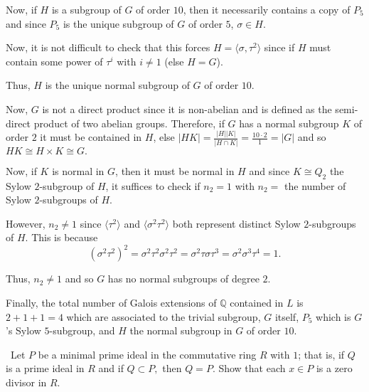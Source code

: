 \documentclass[12pt]{AlgebraQual}
\begin{document}
\begin{solution}
Now, if $H$ is a subgroup of $G$ of order $10$, then it necessarily contains a copy of $P_5$ and since $P_5$ is the unique subgroup of $G$ of order $5$, $\sigma\in H$.

Now, it is not difficult to check that this forces $H=\langle \sigma,\tau^2\rangle$ since if $H$ must contain some power of $\tau^i$ with $i\not=1$ (else $H=G$).

Thus, $H$ is the unique normal subgroup of $G$ of order $10.$

Now, $G$ is not a direct product since it is non-abelian and is defined as the semi-direct product of two abelian groups. Therefore, if $G$ has a normal subgroup $K$ of order $2$ it must be contained in $H$, else $|HK|=\frac{|H||K|}{|H\cap K|}=\frac{10\cdot 2}{1}=|G|$ and so $HK\cong H\times K\cong G.$

Now, if $K$ is normal in $G$, then it must be normal in $H$ and since $K\cong Q_2$ the Sylow $2$-subgroup of $H$, it suffices to check if $n_2=1$ with $n_2=$ the number of Sylow $2$-subgroups of $H$.

However, $n_2\not=1$ since $\langle \tau^2\rangle$ and $\langle \sigma^2\tau^2\rangle$ both represent distinct Sylow $2$-subgroups of $H$. This is because $$(\sigma^2\tau^2)^2=\sigma^2\tau^2\sigma^2\tau^2=\sigma^2\tau\sigma\tau^3=\sigma^2\sigma^3\tau^4=1.$$

Thus, $n_2\not=1$ and so $G$ has no normal subgroups of degree $2.$

Finally, the total number of Galois extensions of $\mathbb{Q}$ contained in $L$ is $2+1+1=4$ which are associated to the trivial subgroup, $G$ itself, $P_5$ which is $G$'s Sylow $5$-subgroup, and $H$ the normal subgroup in $G$ of order $10.$
\end{solution}
\newpage

\begin{problem} $\,$
Let $P$ be a minimal prime ideal in the commutative ring $R$ with $1$; that is, if $Q$ is a prime ideal in $R$ and if $Q\subset P,$ then $Q=P$. Show that each $x\in P$ is a zero divisor in $R.$
\end{problem}
\end{document}
